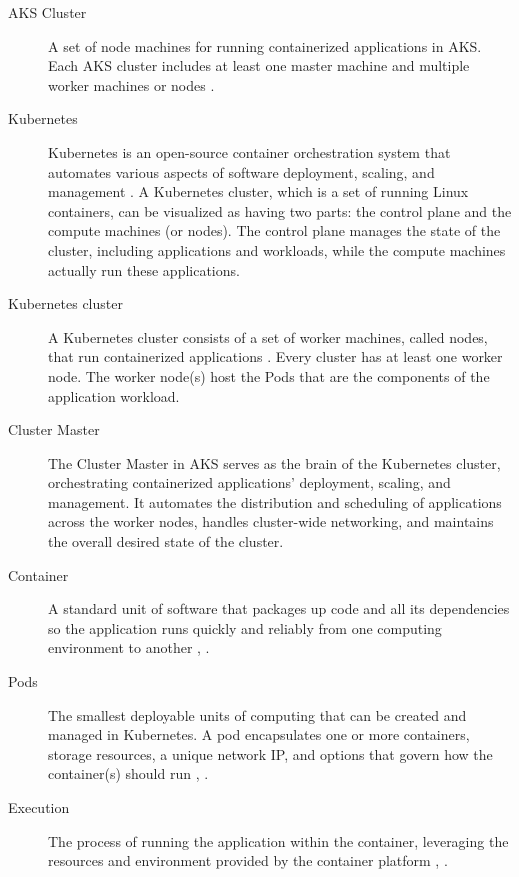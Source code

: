 \documentclass{article}
\begin{document}
\begin{description}
    \item[AKS Cluster] A set of node machines for running containerized applications in AKS. Each AKS cluster includes at least one master machine and multiple worker machines or nodes \cite{azure}. 
	\item[Kubernetes] Kubernetes is an open-source container orchestration system that automates various aspects of software deployment, scaling, and management \cite{kuber}. A Kubernetes cluster, which is a set of running Linux containers, can be visualized as having two parts: the control plane and the compute machines (or nodes). The control plane manages the state of the cluster, including applications and workloads, while the compute machines actually run these applications. 
	\item[Kubernetes cluster] A Kubernetes cluster consists of a set of worker machines, called nodes, that run containerized applications \cite{kuber}. Every cluster has at least one worker node. The worker node(s) host the Pods that are the components of the application workload. 
	\item[Cluster Master] The Cluster Master \cite{kubmaster} in AKS serves as the brain of the Kubernetes cluster, orchestrating containerized applications' deployment, scaling, and management. It automates the distribution and scheduling of applications across the worker nodes, handles cluster-wide networking, and maintains the overall desired state of the cluster. 
	 \item[Container] A standard unit of software that packages up code and all its dependencies so the application runs quickly and reliably from one computing environment to another \cite{docker}, \cite{azure}. 
    \item[Pods] The smallest deployable units of computing that can be created and managed in Kubernetes. A pod encapsulates one or more containers, storage resources, a unique network IP, and options that govern how the container(s) should run \cite{azure}, \cite{kuber}. 

    \item[Execution] The process of running the application within the container, leveraging the resources and environment provided by the container platform \cite{azure}, \cite{kuber}. 
    

\end{description}
\end{document}
